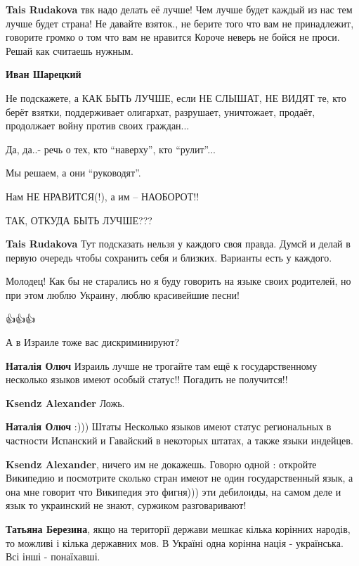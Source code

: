 \begin{itemize}
{\begin{itemize}
\textbf{Tais Rudakova} твк надо делать её лучше! Чем лучше будет каждый из нас тем лучше будет страна! Не давайте взяток., не берите того что вам не принадлежит, говорите громко о том что вам не нравится Короче неверь не бойся не проси. Решай как считаешь нужным.

\textbf{Иван Шарецкий}

Не подскажете, а КАК БЫТЬ ЛУЧШЕ, если НЕ СЛЫШАТ, НЕ ВИДЯТ те, кто берёт взятки,
поддерживает олигархат, разрушает, уничтожает, продаёт, продолжает войну против
своих граждан...

Да, да..- речь о тех, кто \enquote{наверху}, кто \enquote{рулит}...

Мы решаем, а они \enquote{руководят}.

Нам НЕ НРАВИТСЯ(!), а им -- НАОБОРОТ!!

ТАК, ОТКУДА БЫТЬ ЛУЧШЕ???

\textbf{Tais Rudakova} Тут подсказать нельзя у каждого своя правда. Думсй и
делай в первую очередь чтобы сохранить себя и близких. Варианты есть у каждого.
\end{itemize}

Молодец! Как бы не старались но я буду говорить на языке своих родителей, но
при этом люблю Украину, люблю красивейшие песни!

👍👍👍

А в Израиле тоже вас дискриминируют?

\begin{itemize}

\textbf{Наталія Олюч} 
Израиль лучше не трогайте там ещё к государственному несколько языков имеют
особый статус!! Погадить не получится!!

\textbf{Ksendz Alexander} Ложь.

\textbf{Наталія Олюч} :))) Штаты Несколько языков имеют статус региональных в частности Испанский и Гавайский в некоторых штатах, а также языки индейцев.

\textbf{Ksendz Alexander}, ничего им не докажешь. Говорю одной : откройте Википедию и посмотрите сколько стран имеют не один государственный язык, а она мне говорит что Википедия это фигня))) эти дебилоиды, на самом деле и язык то украинский не знают, суржиком разговаривают!

\textbf{Татьяна Березина}, якщо на території держави мешкає кілька корінних
народів, то можливі і кілька державних мов. В Україні одна корінна нація -
українська. Всі інші - понаїхавші.


\end{itemize}}
\end{itemize}
